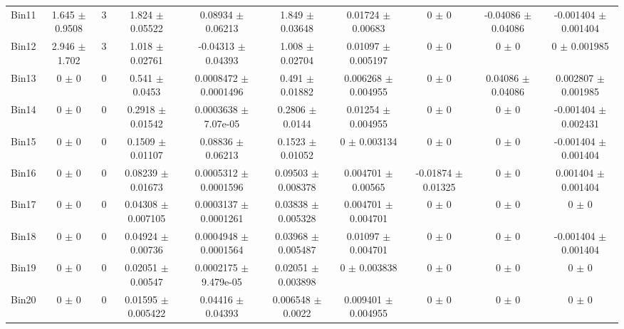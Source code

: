 \begin{tabular}{@{\extracolsep{4pt}}lccccccccc@{}}
     Bin11 & 1.645 $\pm$ 0.9508 & 3 & 1.824 $\pm$ 0.05522 & 0.08934 $\pm$ 0.06213 & 1.849 $\pm$ 0.03648 & 0.01724 $\pm$ 0.00683 & 0 $\pm$ 0 & -0.04086 $\pm$ 0.04086 & -0.001404 $\pm$ 0.001404 \\ 
     Bin12 & 2.946 $\pm$ 1.702 & 3 & 1.018 $\pm$ 0.02761 & -0.04313 $\pm$ 0.04393 & 1.008 $\pm$ 0.02704 & 0.01097 $\pm$ 0.005197 & 0 $\pm$ 0 & 0 $\pm$ 0 & 0 $\pm$ 0.001985 \\ 
     Bin13 & 0 $\pm$ 0 & 0 & 0.541 $\pm$ 0.0453 & 0.0008472 $\pm$ 0.0001496 & 0.491 $\pm$ 0.01882 & 0.006268 $\pm$ 0.004955 & 0 $\pm$ 0 & 0.04086 $\pm$ 0.04086 & 0.002807 $\pm$ 0.001985 \\ 
     Bin14 & 0 $\pm$ 0 & 0 & 0.2918 $\pm$ 0.01542 & 0.0003638 $\pm$ 7.07e-05 & 0.2806 $\pm$ 0.0144 & 0.01254 $\pm$ 0.004955 & 0 $\pm$ 0 & 0 $\pm$ 0 & -0.001404 $\pm$ 0.002431 \\ 
     Bin15 & 0 $\pm$ 0 & 0 & 0.1509 $\pm$ 0.01107 & 0.08836 $\pm$ 0.06213 & 0.1523 $\pm$ 0.01052 & 0 $\pm$ 0.003134 & 0 $\pm$ 0 & 0 $\pm$ 0 & -0.001404 $\pm$ 0.001404 \\ 
     Bin16 & 0 $\pm$ 0 & 0 & 0.08239 $\pm$ 0.01673 & 0.0005312 $\pm$ 0.0001596 & 0.09503 $\pm$ 0.008378 & 0.004701 $\pm$ 0.00565 & -0.01874 $\pm$ 0.01325 & 0 $\pm$ 0 & 0.001404 $\pm$ 0.001404 \\ 
     Bin17 & 0 $\pm$ 0 & 0 & 0.04308 $\pm$ 0.007105 & 0.0003137 $\pm$ 0.0001261 & 0.03838 $\pm$ 0.005328 & 0.004701 $\pm$ 0.004701 & 0 $\pm$ 0 & 0 $\pm$ 0 & 0 $\pm$ 0 \\ 
     Bin18 & 0 $\pm$ 0 & 0 & 0.04924 $\pm$ 0.00736 & 0.0004948 $\pm$ 0.0001564 & 0.03968 $\pm$ 0.005487 & 0.01097 $\pm$ 0.004701 & 0 $\pm$ 0 & 0 $\pm$ 0 & -0.001404 $\pm$ 0.001404 \\ 
     Bin19 & 0 $\pm$ 0 & 0 & 0.02051 $\pm$ 0.00547 & 0.0002175 $\pm$ 9.479e-05 & 0.02051 $\pm$ 0.003898 & 0 $\pm$ 0.003838 & 0 $\pm$ 0 & 0 $\pm$ 0 & 0 $\pm$ 0 \\ 
     Bin20 & 0 $\pm$ 0 & 0 & 0.01595 $\pm$ 0.005422 & 0.04416 $\pm$ 0.04393 & 0.006548 $\pm$ 0.0022 & 0.009401 $\pm$ 0.004955 & 0 $\pm$ 0 & 0 $\pm$ 0 & 0 $\pm$ 0 \\ 
\hline\hline
  \end{tabular}
